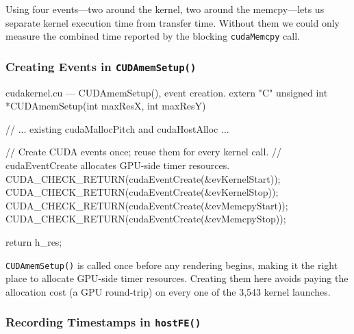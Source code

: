 \documentclass[
	english,
	letterpaper, oneside
]{article}
\begin{document}
Using four events—two around the kernel, two around the memcpy—lets us
separate kernel execution time from transfer time. Without them we could
only measure the combined time reported by the blocking
\texttt{cudaMemcpy} call.

\subsubsection{Creating Events in \texttt{CUDAmemSetup()}}

\begin{sourcecode}{cuda}{kernel.cu — CUDAmemSetup(), event creation.}
extern "C" unsigned int *CUDAmemSetup(int maxResX, int maxResY)
{
    // ... existing cudaMallocPitch and cudaHostAlloc ...

    // Create CUDA events once; reuse them for every kernel call.
    // cudaEventCreate allocates GPU-side timer resources.
    CUDA_CHECK_RETURN(cudaEventCreate(&evKernelStart));
    CUDA_CHECK_RETURN(cudaEventCreate(&evKernelStop));
    CUDA_CHECK_RETURN(cudaEventCreate(&evMemcpyStart));
    CUDA_CHECK_RETURN(cudaEventCreate(&evMemcpyStop));

    return h_res;
}
\end{sourcecode}

\texttt{CUDAmemSetup()} is called once before any rendering begins, making
it the right place to allocate GPU-side timer resources. Creating them here
avoids paying the allocation cost (a GPU round-trip) on every one of the
3,543 kernel launches.

\subsubsection{Recording Timestamps in \texttt{hostFE()}}
\end{document}

